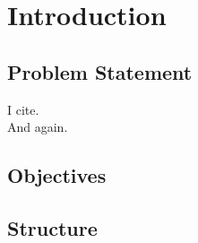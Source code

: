 \section{Introduction}
\subsection{Problem Statement}
I cite.\autocite[cf.][149]{Chang.2014}\\
And again.\autocite[4-5]{Dunser.2012}
\subsection{Objectives}
\subsection{Structure}
